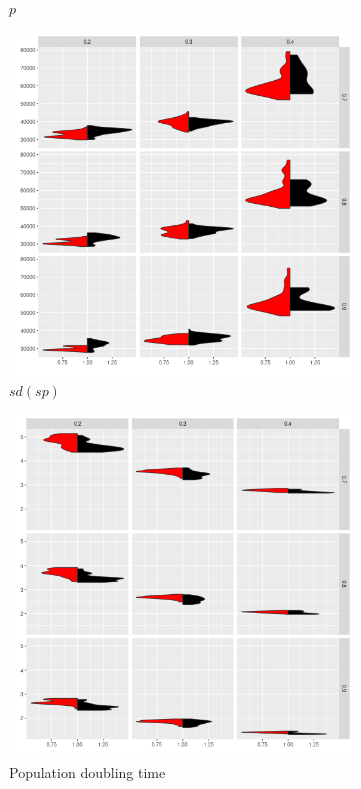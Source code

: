 \begin{figure}[!ht]
\begin{subfigure}{0.32\textwidth}
		\caption{$p$}
		\label{fig:grid-p}
	\end{subfigure}
	\begin{subfigure}{0.32\textwidth}  
		\centering 
		\includegraphics[width=\textwidth]{figures/v-sp-1.png}
		\caption{$sd(sp)$}
		\label{fig:grid-sp}
	\end{subfigure}	\begin{subfigure}{0.32\textwidth}  
		\centering 
		\includegraphics[width=\textwidth]{figures/v-d-1.png}
		\caption{Population doubling time}
		\label{fig:grid-dt}
	\end{subfigure}
	\caption{}
	\label{ref:grid}
\end{figure}
\fi


